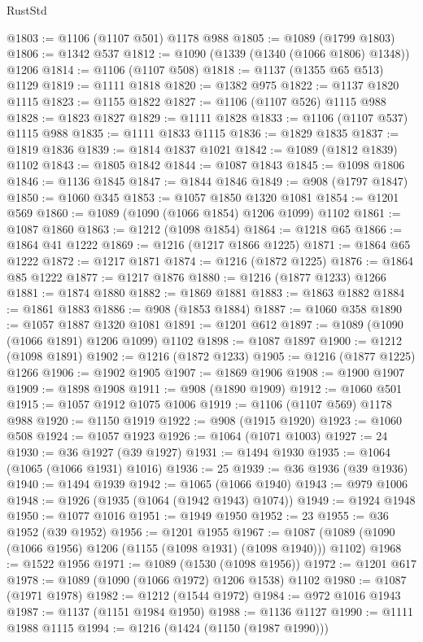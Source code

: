 \begin{lexlean}{RustStd}
\begin{coremodule}
@1803 := @1106 (@1107 @501) @1178 @988
@1805 := @1089 (@1799 @1803)
@1806 := @1342 @537
@1812 := @1090 (@1339 (@1340 (@1066 @1806) @1348)) @1206
@1814 := @1106 (@1107 @508)
@1818 := @1137 (@1355 @65 @513) @1129
@1819 := @1111 @1818
@1820 := @1382 @975
@1822 := @1137 @1820 @1115
@1823 := @1155 @1822
@1827 := @1106 (@1107 @526) @1115 @988
@1828 := @1823 @1827
@1829 := @1111 @1828
@1833 := @1106 (@1107 @537) @1115 @988
@1835 := @1111 @1833 @1115
@1836 := @1829 @1835
@1837 := @1819 @1836
@1839 := @1814 @1837 @1021
@1842 := @1089 (@1812 @1839) @1102
@1843 := @1805 @1842
@1844 := @1087 @1843
@1845 := @1098 @1806
@1846 := @1136 @1845
@1847 := @1844 @1846
@1849 := @908 (@1797 @1847)
@1850 := @1060 @345
@1853 := @1057 @1850 @1320 @1081
@1854 := @1201 @569
@1860 := @1089 (@1090 (@1066 @1854) @1206 @1099) @1102
@1861 := @1087 @1860
@1863 := @1212 (@1098 @1854)
@1864 := @1218 @65
@1866 := @1864 @41 @1222
@1869 := @1216 (@1217 @1866 @1225)
@1871 := @1864 @65 @1222
@1872 := @1217 @1871
@1874 := @1216 (@1872 @1225)
@1876 := @1864 @85 @1222
@1877 := @1217 @1876
@1880 := @1216 (@1877 @1233) @1266
@1881 := @1874 @1880
@1882 := @1869 @1881
@1883 := @1863 @1882
@1884 := @1861 @1883
@1886 := @908 (@1853 @1884)
@1887 := @1060 @358
@1890 := @1057 @1887 @1320 @1081
@1891 := @1201 @612
@1897 := @1089 (@1090 (@1066 @1891) @1206 @1099) @1102
@1898 := @1087 @1897
@1900 := @1212 (@1098 @1891)
@1902 := @1216 (@1872 @1233)
@1905 := @1216 (@1877 @1225) @1266
@1906 := @1902 @1905
@1907 := @1869 @1906
@1908 := @1900 @1907
@1909 := @1898 @1908
@1911 := @908 (@1890 @1909)
@1912 := @1060 @501
@1915 := @1057 @1912 @1075 @1006
@1919 := @1106 (@1107 @569) @1178 @988
@1920 := @1150 @1919
@1922 := @908 (@1915 @1920)
@1923 := @1060 @508
@1924 := @1057 @1923
@1926 := @1064 (@1071 @1003)
@1927 := 24
@1930 := @36 @1927 (@39 @1927)
@1931 := @1494 @1930
@1935 := @1064 (@1065 (@1066 @1931) @1016)
@1936 := 25
@1939 := @36 @1936 (@39 @1936)
@1940 := @1494 @1939
@1942 := @1065 (@1066 @1940)
@1943 := @979 @1006
@1948 := @1926 (@1935 (@1064 (@1942 @1943) @1074))
@1949 := @1924 @1948
@1950 := @1077 @1016
@1951 := @1949 @1950
@1952 := 23
@1955 := @36 @1952 (@39 @1952)
@1956 := @1201 @1955
@1967 := @1087 (@1089 (@1090 (@1066 @1956) @1206 (@1155 (@1098 @1931) (@1098 @1940))) @1102)
@1968 := @1522 @1956
@1971 := @1089 (@1530 (@1098 @1956))
@1972 := @1201 @617
@1978 := @1089 (@1090 (@1066 @1972) @1206 @1538) @1102
@1980 := @1087 (@1971 @1978)
@1982 := @1212 (@1544 @1972)
@1984 := @972 @1016 @1943
@1987 := @1137 (@1151 @1984 @1950)
@1988 := @1136 @1127
@1990 := @1111 @1988 @1115
@1994 := @1216 (@1424 (@1150 (@1987 @1990)))

\end{coremodule}
\end{lexlean}
